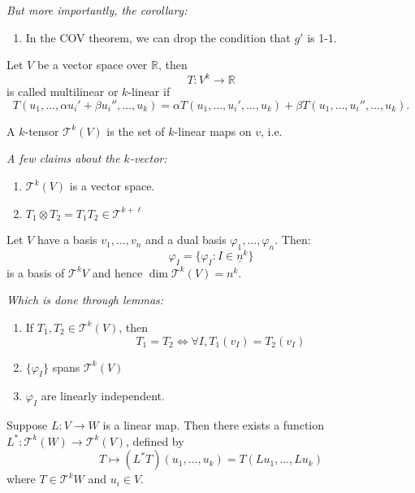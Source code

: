 \documentclass{article}
\numberwithin{equation}{section}
\begin{document}
\textit{But more importantly, the corollary:}
\begin{enumerate}
    \item In the COV theorem, we can drop the condition that $g'$ is 1-1.
\end{enumerate}
\begin{definition}
    Let $V$ be a vector space over $\mathbb{R}$, then 
    \begin{equation}
        T: V^k \rightarrow \mathbb{R}
    \end{equation}
    is called multilinear or $k$-linear if
    \begin{equation}
        T(u_1,\dots,\alpha u_i'+\beta u_i'', \dots, u_k) = \alpha T(u_1,\dots,u_i',\dots,u_k) + \beta T(u_1,\dots,u_i'',\dots,u_k).
    \end{equation}
\end{definition}
\begin{definition}
    A $k$-tensor $\mathcal{T}^k(V)$ is the set of $k$-linear maps on $v$, i.e.
\end{definition}
\textit{A few claims about the $k$-vector:}
\begin{enumerate}
    \item $\mathcal{T}^k(V)$ is a vector space.
    \item $T_1 \otimes T_2 = T_1T_2 \in \mathcal{T}^{k+\ell}$
\end{enumerate}
\begin{theorem}
    Let $V$ have a basis $v_1,\dots,v_n$ and a dual basis $\varphi_1,\dots,\varphi_n$. Then:
    \begin{equation}
        \varphi_I = \{\varphi_I: I\in \underline{n}^k\}
    \end{equation}
    is a basis of $\mathcal{T}^kV$ and hence $\dim \mathcal{T}^k(V) = n^k$.
\end{theorem}
\textit{Which is done through lemmas:}
\begin{enumerate}
    \item If $T_1,T_2 \in \mathcal{T}^k(V)$, then 
    \begin{equation}
        T_1 = T_2 \iff \forall I, T_1(v_I) = T_2(v_I)
    \end{equation}
    \item $\{\varphi_I\}$ spans $\mathcal{T}^k(V)$
    \item $\varphi_I$ are linearly independent.
\end{enumerate}
\begin{definition}
    Suppose $L:V\rightarrow W$ is a linear map. Then there exists a function $L^*: \mathcal{T}^k(W) \rightarrow \mathcal{T}^k(V)$, defined by
    \begin{equation}
        T \mapsto (L^*T)(u_1,\dots,u_k) = T(Lu_1,\dots,Lu_k)
    \end{equation}
    where $T\in \mathcal{T}^kW$ and $u_i \in V.$
\end{definition}
\end{document}
